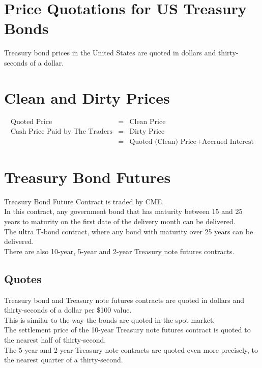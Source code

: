 \section{Price Quotations for US Treasury Bonds}
Treasury bond prices in the United States are quoted in dollars and thirty-seconds of a dollar.

\section{Clean and Dirty Prices}
\begin{eqnarray}
	\text{Quoted Price} &=& \text{Clean Price}\\
	\text{Cash Price Paid by The Traders} &=& \text{Dirty Price}\\
	\nonumber
	&=& \text{Quoted (Clean) Price} + \text{Accrued Interest}
\end{eqnarray}

\section{Treasury Bond Futures}
Treasury Bond Future Contract is traded by CME.\\
In this contract, any government bond that has maturity between 15 and 25 years to maturity on the first date of the delivery month can be delivered.\\
The ultra T-bond contract, where any bond with maturity over 25 years can be delivered.\\
There are also 10-year, 5-year and 2-year Treasury note futures contracts.

\subsection{Quotes}
Treasury bond and Treasury note futures contracts are quoted in dollars and thirty-seconds of a dollar per \$100 value.\\
This is similar to the way the bonds are quoted in the spot market.\\
The settlement price of the 10-year Treasury note futures contract is quoted to the nearest half of thirty-second.\\
The 5-year and 2-year Treasury note contracts are quoted even more precisely, to the nearest quarter of a thirty-second.

